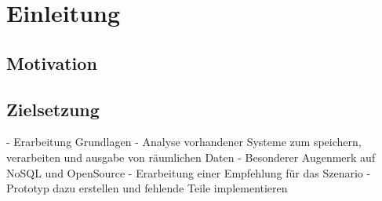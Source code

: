 \chapter{Einleitung}


\section{Motivation}




\section{Zielsetzung}
- Erarbeitung Grundlagen
- Analyse vorhandener Systeme zum speichern, verarbeiten und ausgabe von räumlichen Daten
- Besonderer Augenmerk auf NoSQL und OpenSource
- Erarbeitung einer Empfehlung für das Szenario
- Prototyp dazu erstellen und fehlende Teile implementieren
